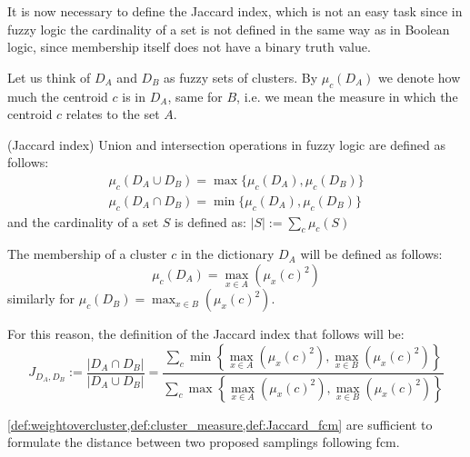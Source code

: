 \noindent It is now necessary to define the Jaccard index, which is not an easy task since in fuzzy logic the cardinality of a set is not defined in the same way as in Boolean logic, since membership itself does not have a binary truth value.

\noindent Let us think of $D_A$ and $D_B$ as fuzzy sets of clusters. By $\mu_c(D_A)$ we denote how much the centroid $c$ is in $D_A$, same for $B$, i.e. we mean the measure in which the centroid $c$ relates to the set $A$.
\begin{definition}(Jaccard index)
	\label{def:Jaccard_fcm}
	Union and intersection operations in fuzzy logic are defined as follows:
	\begin{align*}
	\mu_c(D_A\cup D_B) = \max\{\mu_c(D_A),\mu_c(D_B)\} \\
	\mu_c(D_A\cap D_B) = \min\{\mu_c(D_A),\mu_c(D_B)\}
	\end{align*}
	and the cardinality of a set $S$ is defined as: $|S|:=\sum_c \mu_c(S)$

	\noindent The membership of a cluster $c$ in the dictionary $D_A$ will be defined as follows:
	\begin{equation}
		\mu_c(D_A) = \max_{x\in A}(\mu_x(c)^2)
	\end{equation}
	similarly for $\mu_c(D_B) = \max_{x\in B}(\mu_x(c)^2)$.

	\noindent For this reason, the definition of the Jaccard index that follows will be:
	\begin{equation}
		J_{D_A,D_B} :=
		\frac{
			\left|D_A \cap D_B\right|
		}{
			\left|D_A \cup D_B\right|
		}
		= \frac{
			\sum_c \min \left\{
				\max_{x\in A}\left(
					\mu_x\left(c\right)^2
				\right), \max_{x\in B}\left(
					\mu_x\left(c\right)^2
				\right)
			\right\}
		}{
			\sum_c \max\left\{
				\max_{x\in A}\left(
					\mu_x\left(c\right)^2
				\right),\max_{x\in B}\left(
					\mu_x\left(c\right)^2
				\right)
			\right\}
		}
	\end{equation}
\end{definition}

\noindent \cref{def:weightovercluster,def:cluster_measure,def:Jaccard_fcm} are sufficient to formulate the distance between two proposed samplings following \gls{fcm}.

